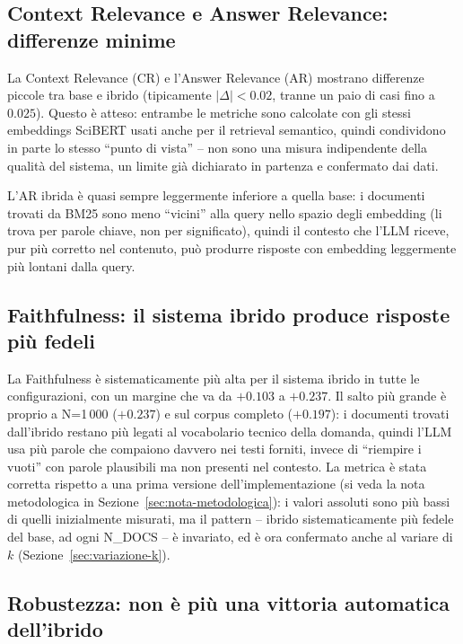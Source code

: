 \documentclass[12pt,a4paper]{article}
\begin{document}
\subsection{Context Relevance e Answer Relevance: differenze minime}
\label{sec:cr-ar-limite}

La Context Relevance (CR) e l'Answer Relevance (AR) mostrano differenze piccole tra base e ibrido (tipicamente $|\Delta| < 0.02$, tranne un paio di casi fino a $0.025$). Questo \`e atteso: entrambe le metriche sono calcolate con gli stessi embeddings SciBERT usati anche per il retrieval semantico, quindi condividono in parte lo stesso ``punto di vista'' -- non sono una misura indipendente della qualit\`a del sistema, un limite gi\`a dichiarato in partenza e confermato dai dati.

L'AR ibrida \`e quasi sempre leggermente inferiore a quella base: i documenti trovati da BM25 sono meno ``vicini'' alla query nello spazio degli embedding (li trova per parole chiave, non per significato), quindi il contesto che l'LLM riceve, pur pi\`u corretto nel contenuto, pu\`o produrre risposte con embedding leggermente pi\`u lontani dalla query.

\subsection{Faithfulness: il sistema ibrido produce risposte pi\`u fedeli}

La Faithfulness \`e sistematicamente pi\`u alta per il sistema ibrido in tutte le configurazioni, con un margine che va da $+0.103$ a $+0.237$. Il salto pi\`u grande \`e proprio a N=1\,000 ($+0.237$) e sul corpus completo ($+0.197$): i documenti trovati dall'ibrido restano pi\`u legati al vocabolario tecnico della domanda, quindi l'LLM usa pi\`u parole che compaiono davvero nei testi forniti, invece di ``riempire i vuoti'' con parole plausibili ma non presenti nel contesto. La metrica \`e stata corretta rispetto a una prima versione dell'implementazione (si veda la nota metodologica in Sezione~\ref{sec:nota-metodologica}): i valori assoluti sono pi\`u bassi di quelli inizialmente misurati, ma il pattern -- ibrido sistematicamente pi\`u fedele del base, ad ogni N\_DOCS -- \`e invariato, ed \`e ora confermato anche al variare di $k$ (Sezione~\ref{sec:variazione-k}).

\subsection{Robustezza: non \`e pi\`u una vittoria automatica dell'ibrido}
\end{document}
